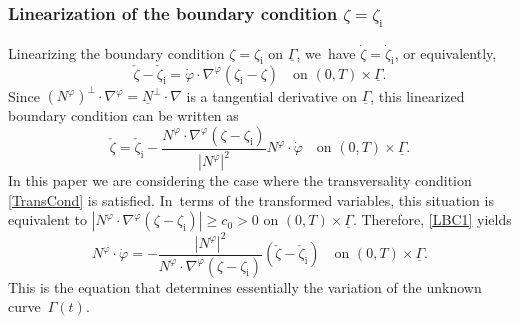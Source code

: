 \documentclass[10pt]{amsart}
\newcommand{\ul}[1]{\underline{#1}}
\newcommand{\itGamma}{\mathit{\Gamma}}
\theoremstyle{definition}
\begin{document}
\subsubsection{Linearization of the boundary condition $\zeta=\zeta_\mathrm{i}$}
Linearizing the boundary condition $\zeta=\zeta_\mathrm{i}$ on $\ul{\itGamma}$, we~have $\dot{\zeta}=\dot{\zeta}_\mathrm{i}$, or equivalently,
\[
\check{\zeta}-\check{\zeta}_\mathrm{i} = \dot{\varphi}\cdot\nabla^\varphi(\zeta_\mathrm{i}-\zeta) \quad\text{on } (0,T)\times\ul{\itGamma}.
\]
Since $(N^\varphi)^\perp\cdot\nabla^\varphi=\ul{N}^\perp\cdot\nabla$ is a tangential derivative on $\ul{\itGamma}$,
this linearized boundary condition can be written as
\begin{equation}\label{LBC1}
\check{\zeta}=\check{\zeta}_\mathrm{i}-\frac{N^\varphi\cdot\nabla^\varphi(\zeta-\zeta_\mathrm{i})}{|N^\varphi|^2} N^\varphi\cdot\dot{\varphi}
\quad\text{on } (0,T)\times\ul{\itGamma}.
\end{equation}
In this paper we are considering the case where the transversality condition \eqref{TransCond} is satisfied. In~terms of the transformed variables,
this situation is equivalent to $|N^\varphi\cdot\nabla^\varphi(\zeta-\zeta_\mathrm{i})| \geq c_0>0$ on $(0,T)\times\ul{\itGamma}$.
Therefore, \eqref{LBC1} yields
\begin{equation}\label{EqPhi}
N^\varphi\cdot\dot{\varphi} = -\frac{|N^\varphi|^2}{N^\varphi\cdot\nabla^\varphi(\zeta-\zeta_\mathrm{i})}(\check{\zeta} -\check{\zeta}_\mathrm{i})
\quad\text{on } (0,T)\times\ul{\itGamma}.
\end{equation}
This is the equation that determines essentially the variation of the unknown curve~$\itGamma(t)$.
\end{document}
